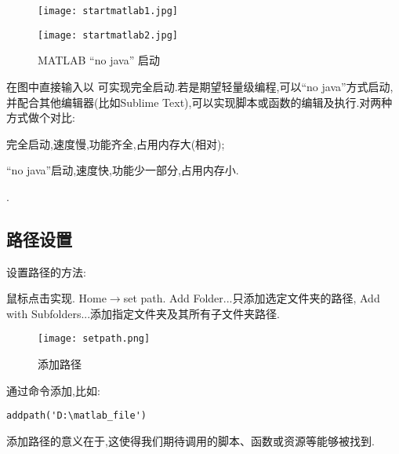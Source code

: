 \begin{figure}[htbp]
  \centering
  \texttt{[image: startmatlab1.jpg]}
\end{figure}

\begin{figure}[htbp]
  \centering
  \texttt{[image: startmatlab2.jpg]}
  \caption{MATLAB “no java” 启动}
\end{figure}

在图中直接输入以  可实现完全启动.若是期望轻量级编程,可以“no java”方式启动,并配合其他编辑器(比如Sublime Text),可以实现脚本或函数的编辑及执行.对两种方式做个对比:

\begindot
  \item 完全启动,速度慢,功能齐全,占用内存大(相对);
  \item “no java”启动,速度快,功能少一部分,占用内存小.
\myenddot

.


\subsection{路径设置}
设置路径的方法:
\begindot
  \item 鼠标点击实现. Home$\rightarrow$set path. Add Folder...只添加选定文件夹的路径, Add with Subfolders...添加指定文件夹及其所有子文件夹路径.

    \begin{figure}[htbp]
      \centering
      \texttt{[image: setpath.png]}
      \caption{添加路径}
    \end{figure}

  \item 通过命令添加,比如:

    \vspace{-0.8cm}
    \begin{lstlisting}[caption = 添加路径]
      addpath('D:\matlab_file')
    \end{lstlisting}

\myenddot
添加路径的意义在于,这使得我们期待调用的脚本、函数或资源等能够被找到.



